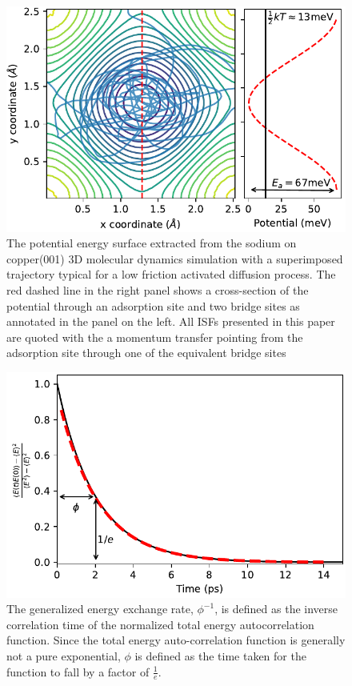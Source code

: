 \documentclass[7pt]{article}
\begin{document}
\begin{figure}
	\centering
	\includegraphics[width=1.0\columnwidth]{pot_surface}
	\caption{The potential energy surface extracted from the sodium on copper(001) 3D molecular dynamics simulation with a superimposed trajectory typical for a low friction activated diffusion process. The red dashed line in the right panel shows a cross-section of the potential through an adsorption site and two bridge sites as annotated in the panel on the left. All ISFs presented in this paper are quoted with the a momentum transfer pointing from the adsorption site through one of the equivalent bridge sites}
	\label{fig:pot_surface}
\end{figure}

\begin{figure}
	\centering
	\includegraphics[width=1.0\columnwidth]{e_auto}
	\caption{The generalized energy exchange rate, $\phi^{-1}$, is defined as the inverse correlation time of the normalized total energy autocorrelation function. Since the total energy auto-correlation function is generally not a pure exponential, $\phi$ is defined as the time taken for the function to fall by a factor of $\frac{1}{e}$.}
	\label{fig:e_auto}
\end{figure}
\end{document}
